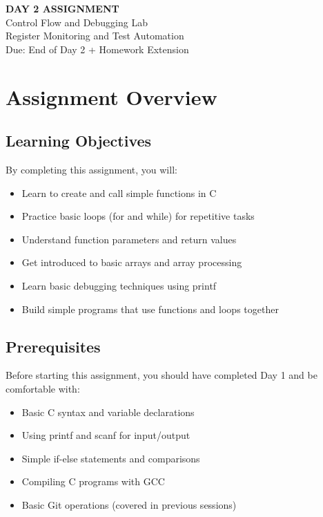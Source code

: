 \documentclass[11pt,a4paper]{article}
\begin{document}
\begin{center}
    {\Huge\bfseries\color{codeblue} DAY 2 ASSIGNMENT}\\[0.5cm]
    {\Large Control Flow and Debugging Lab}\\[0.3cm]
    {\large Register Monitoring and Test Automation}\\[0.2cm]
    {\normalsize Due: End of Day 2 + Homework Extension}
\end{center}

\vspace{1cm}

\section{Assignment Overview}

\subsection{Learning Objectives}
By completing this assignment, you will:
\begin{itemize}
    \item Learn to create and call simple functions in C
    \item Practice basic loops (for and while) for repetitive tasks
    \item Understand function parameters and return values
    \item Get introduced to basic arrays and array processing
    \item Learn basic debugging techniques using printf
    \item Build simple programs that use functions and loops together
\end{itemize}

\subsection{Prerequisites}
Before starting this assignment, you should have completed Day 1 and be comfortable with:
\begin{itemize}
    \item Basic C syntax and variable declarations
    \item Using printf and scanf for input/output
    \item Simple if-else statements and comparisons
    \item Compiling C programs with GCC
    \item Basic Git operations (covered in previous sessions)
\end{itemize}
\end{document}

